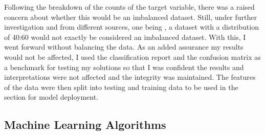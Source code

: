 \documentclass[10pt,twocolumn,letterpaper]{article}
\begin{document}
Following the breakdown of the counts of the target variable, there was a raised concern about whether this would be an imbalanced dataset. Still, under further investigation and from different sources, one being \cite{Mazumder}, a dataset with a distribution of 40:60 would not exactly be considered an imbalanced dataset. With this, I went forward without balancing the data. As an added assurance my results would not be affected, I used the classification report and the confusion matrix as a benchmark for testing my solutions so that I was confident the results and interpretations were not affected and the integrity was maintained. The features of the data were then split into testing and training data to be used in the section for model deployment.

\subsection{Machine Learning Algorithms}
\end{document}
